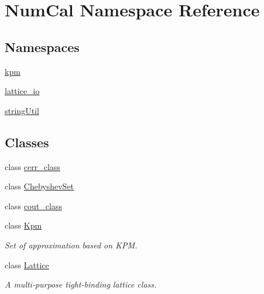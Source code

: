 \hypertarget{namespaceNumCal}{\section{Num\+Cal Namespace Reference}
\label{namespaceNumCal}
}
\subsection*{Namespaces}
\begin{DoxyCompactItemize}
\item 
 \hyperlink{namespaceNumCal_1_1kpm}{kpm}
\item 
 \hyperlink{namespaceNumCal_1_1lattice__io}{lattice\+\_\+io}
\item 
 \hyperlink{namespaceNumCal_1_1stringUtil}{string\+Util}
\end{DoxyCompactItemize}
\subsection*{Classes}
\begin{DoxyCompactItemize}
\item 
class \hyperlink{classNumCal_1_1cerr__class}{cerr\+\_\+class}
\item 
class \hyperlink{classNumCal_1_1ChebyshevSet}{Chebyshev\+Set}
\item 
class \hyperlink{classNumCal_1_1cout__class}{cout\+\_\+class}
\item 
class \hyperlink{classNumCal_1_1Kpm}{Kpm}
\begin{DoxyCompactList}\small\item\em Set of approximation based on K\+P\+M. \end{DoxyCompactList}\item 
class \hyperlink{classNumCal_1_1Lattice}{Lattice}
\begin{DoxyCompactList}\small\item\em A multi-\/purpose tight-\/binding lattice class. \end{DoxyCompactList}\end{DoxyCompactItemize}
